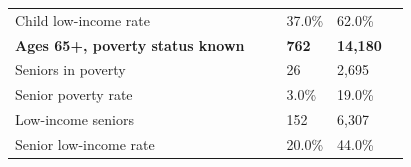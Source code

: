 \documentclass[9pt]{report}
\begin{document}
\begin{tabular}{p{.10in}p{.10in}p{.10in}p{3.7in}>{\hfill}p{.85in}>{\hfill}p{.85in}>{\hfill}p{.85in}>{\hfill}p{.85in}p{0.1in}}
\multicolumn{4}{l}{\parbox{3.6in}{\strut\raggedright{{Child low-income rate}}\strut}} &  &  & 37.0\% & 62.0\% & \multicolumn{1}{l}{}  \\ 
\multicolumn{4}{l}{\parbox{3.5in}{\strut\raggedright{\textbf{Ages 65+, poverty status known}\strut}}} & \textbf{} & \textbf{} & \textbf{762} & \textbf{14,180} & \textbf{} \\ 
\multicolumn{4}{l}{\parbox{3.6in}{\strut\raggedright{{Seniors in poverty}}\strut}} &  &  & 26 & 2,695 & \multicolumn{1}{l}{}  \\ 
\multicolumn{4}{l}{\parbox{3.6in}{\strut\raggedright{{Senior poverty rate}}\strut}} &  &  & 3.0\% & 19.0\% & \multicolumn{1}{l}{}  \\ 
\multicolumn{4}{l}{\parbox{3.6in}{\strut\raggedright{{Low-income seniors}}\strut}} &  &  & 152 & 6,307 & \multicolumn{1}{l}{}  \\ 
\multicolumn{4}{l}{\parbox{3.6in}{\strut\raggedright{{Senior low-income rate}}\strut}} &  &  & 20.0\% & 44.0\% & \multicolumn{1}{l}{}  \\ 

\end{tabular}
\setlength{\tabcolsep}{6pt} %
\end{document}
